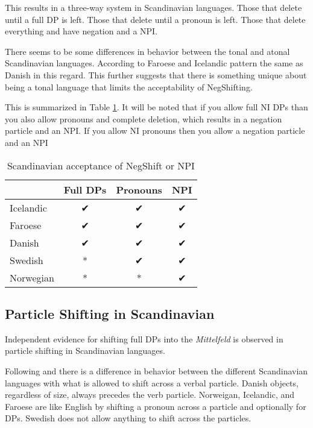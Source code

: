 \documentclass[12pt, letterpaper]{article}
\begin{document}
\ex This results in a three-way system in Scandinavian languages. 
	\ea Those that delete until a full DP is left.
	\ex Those that delete until a pronoun is left.
	\ex Those that delete everything and have negation and a NPI.
	\z 

\ex There seems to be some differences in behavior between the tonal and atonal Scandinavian languages. 
	\ea According to \citet{thrainssonFaroeseOverviewReference2004,thrainssonSyntaxIcelandic2010} Faroese and Icelandic pattern the same as Danish in this regard. 
	\ex This further suggests that there is something unique about being a tonal language that limits the acceptability of NegShifting. 
	\z 

\ex This is summarized in Table \ref{tab:Paradigm}.
	\ea It will be noted that if you allow full NI DPs than you also allow pronouns and complete deletion, which results in a negation particle and an NPI.
	\ex If you allow NI pronouns then you allow a negation particle and an NPI
	\z 
\begin{table}[!ht]
	\centering
	\caption{Scandinavian acceptance of NegShift or NPI}
	\label{tab:Paradigm}
\begin{tabular}{lccc}
	\hline 
	& Full DPs & Pronouns & NPI\\
	\hline
	Icelandic & ✔︎ & ✔︎ & ✔︎ \\
	Faroese & ✔︎ & ✔︎ & ✔︎ \\
	Danish & ✔︎ & ✔︎ & ✔︎ \\
	Swedish & * & ✔︎ & ✔︎ \\
	Norwegian & * & * & ✔︎ \\
	\hline 
\end{tabular} 
\end{table}
\z 

\subsection{Particle Shifting in Scandinavian} \label{sec:HNPS}

\ea Independent evidence for shifting full DPs into the \emph{Mittelfeld} is observed in particle shifting in Scandinavian languages. 

\ex Following \citet[2]{holmbergRemarksHolmbergGeneralization1999} and \citet{faarlundSyntaxMainlandScandinavian2019} there is a difference in behavior between the different Scandinavian languages with what is allowed to shift across a verbal particle.
	\ea Danish objects, regardless of size, always precedes the verb particle. 
	\ex Norweigan, Icelandic, and Faroese are like English by shifting a pronoun across a particle and optionally for DPs.
	\ex Swedish does not allow anything to shift across the particles. 
	\z 
\end{document}
